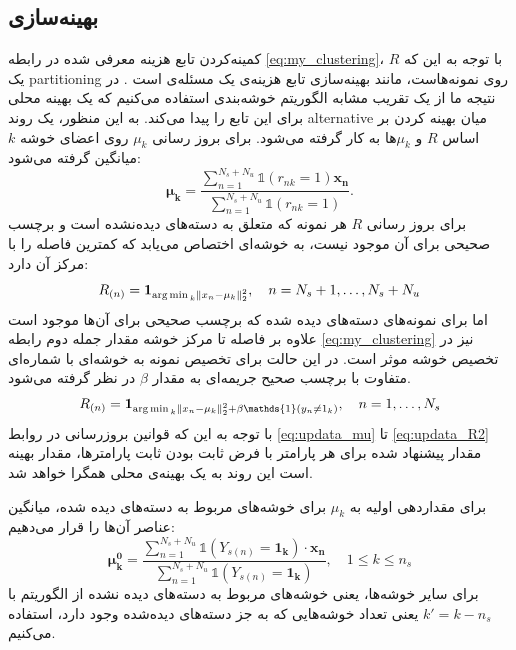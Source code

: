 \subsection{بهینه‌سازی}\label{simple_opt}
 کمینه‌کردن تابع هزینه معرفی شده در رابطه
\eqref{eq:my_clustering}،
با توجه به این که $R$ یک \gls{partitioning} روی نمونه‌هاست، مانند بهینه‌سازی تابع هزینه‌ی  یک مسئله‌ی \nphard است \cite{kmeans_nphard}. در نتیجه ما از یک تقریب
مشابه الگوریتم خوشه‌بندی  استفاده می‌کنیم که یک بهینه محلی برای این تابع را پیدا می‌کند. به این منظور،  یک روند \gls{alternative}  میان بهینه کردن بر اساس $R$ و $\mu_k$ها به کار گرفته می‌شود. برای بروز رسانی $\mu_k$ روی اعضای خوشه $k$ میانگین گرفته می‌شود:
\begin{equation} \label{eq:updata_mu}
 \boldsymbol{\mu_k} = \frac{\sum_{n=1}^{N_s + N_u}  \mathds{1}(r_{nk}=1)\mathbf{x_n}}{\sum_{n=1}^{N_s+N_u}\mathds{1}(r_{nk}=1)}.
\end{equation}
برای بروز رسانی $R$ هر نمونه که متعلق به دسته‌های دیده‌نشده است و برچسب صحیحی برای آن موجود نیست، به خوشه‌ای اختصاص می‌یابد که کمترین فاصله را با مرکز آن دارد:
\begin{equation} \label{eq:updata_R}
R_{(n)} = \mathbf{1}_{\operatorname*{arg\,min\,}_k \left \lVert x_n - \mu_k \right \rVert_2^2}, \quad n=N_s+1,\ldots,N_s+N_u
\end{equation}
اما برای نمونه‌های دسته‌های دیده شده که برچسب صحیحی برای آن‌ها موجود است علاوه بر فاصله تا مرکز خوشه مقدار جمله دوم رابطه \eqref{eq:my_clustering} نیز در تخصیص خوشه موثر است. در این حالت برای تخصیص نمونه به خوشه‌ای با شماره‌ای متفاوت با برچسب صحیح جریمه‌ای به مقدار $\beta$ در نظر گرفته می‌شود.
\begin{align}\label{eq:updata_R2}
R_{(n)} = \mathbf{1}_{\argmin_k \normtwo{x_n - \mu_k} + \beta \mathds{1}(y_n \neq 1_k)}, \quad n=1,\ldots,N_s
\end{align}
با توجه به این که قوانین بروزرسانی در روابط \eqref{eq:updata_mu} تا \eqref{eq:updata_R2} مقدار پیشنهاد شده برای هر پارامتر با فرض ثابت بودن ثابت پارامترها، مقدار بهینه است این روند به یک بهینه‌ی محلی همگرا خواهد شد.

برای مقداردهی اولیه به $\mu_k$ برای  خوشه‌های مربوط به دسته‌های دیده شده، میانگین عناصر آن‌ها را قرار می‌دهیم:
\begin{equation} \label{eq:init_mu}
 \boldsymbol{\mu_k^0} = \frac{\sum_{n=1}^{N_s + N_u}  \mathds{1}(Y_{s(n)} = \mathbf{1_k})\cdot \mathbf{x_n}}{\sum_{n=1}^{N_s+N_u}\mathds{1}(Y_{s(n)} = \mathbf{1_k})},
\quad 1 \leq k \leq n_s
\end{equation}
برای سایر خوشه‌ها، یعنی خوشه‌های مربوط به دسته‌های دیده نشده از الگوریتم
 \cite{kmeanspp}
با $k' = k- n_s$ یعنی تعداد خوشه‌هایی که به جز دسته‌های دیده‌شده وجود دارد،
استفاده می‌کنیم.



